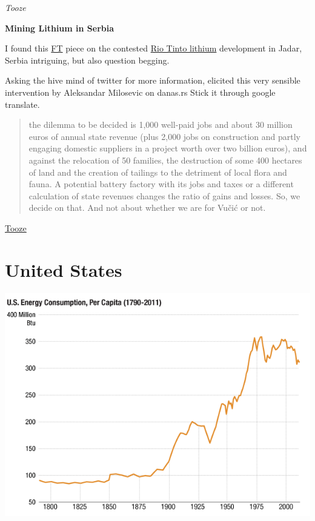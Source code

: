 \documentclass[
]{book}
\begin{document}
\emph{Tooze}

\textbf{Mining Lithium in Serbia}

I found this \href{https://www.ft.com/content/707e7a39-f357-484a-8efc-b0b7dc475600}{FT} piece on the contested \href{https://www.riotinto.com/en/operations/projects/jadar}{Rio Tinto lithium} development in Jadar, Serbia intriguing, but also question begging.

Asking the hive mind of twitter for more information, elicited this very sensible intervention by Aleksandar Milosevic on danas.rs Stick it through google translate.

\begin{quote}
the dilemma to be decided is 1,000 well-paid jobs and about 30 million euros of annual state revenue (plus 2,000 jobs on construction and partly engaging domestic suppliers in a project worth over two billion euros), and against the relocation of 50 families, the destruction of some 400 hectares of land and the creation of tailings to the detriment of local flora and fauna. A potential battery factory with its jobs and taxes or a different calculation of state revenues changes the ratio of gains and losses. So, we decide on that. And not about whether we are for Vučić or not.
\end{quote}

\href{https://adamtooze.substack.com/p/serbian-lithium-mother-courage-and}{Tooze}

\hypertarget{united-states}{%
\chapter{United States}\label{united-states}}

\includegraphics{fig/us_energy_consumption_pc_1790-2011.png}
\end{document}
